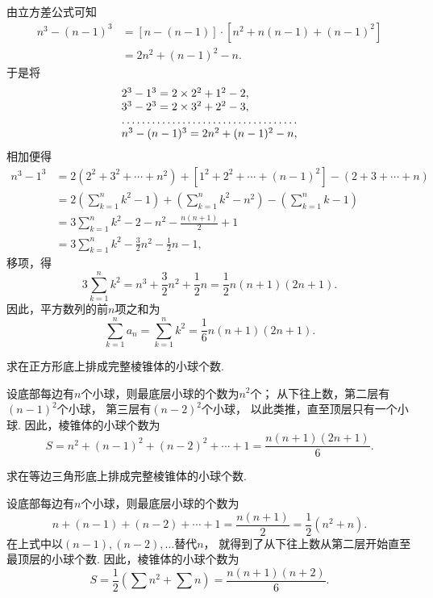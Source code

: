 由立方差公式可知
\[\begin{aligned}
n^3 - (n-1)^3
&= [n - (n-1)] \cdot [n^2 + n(n-1) + (n-1)^2] \\
&= 2n^2 + (n-1)^2 - n.
\end{aligned}\]于是将\[
\begin{array}{l}
2^3 - 1^3 = 2\times2^2+1^2-2, \\
3^3 - 2^3 = 2\times3^2+2^2-3, \\
\hdotsfor{1} \\
n^3 - (n-1)^3 = 2n^2 + (n-1)^2 - n,
\end{array}
\]相加便得\[\begin{aligned}
n^3 - 1^3
&= 2(2^2+3^2+\dotsb+n^2) + [1^2+2^2+\dotsb+(n-1)^2] - (2+3+\dotsb+n) \\
&= 2\left(\sum_{k=1}^n k^2 - 1\right)
    + \left(\sum_{k=1}^n k^2 - n^2\right)
    - \left(\sum_{k=1}^n k - 1\right) \\
&= 3\sum_{k=1}^n k^2 - 2 - n^2 - \frac{n(n+1)}{2} + 1 \\
&= 3\sum_{k=1}^n k^2 - \frac{3}{2} n^2 - \frac{1}{2} n - 1,
\end{aligned}\]
移项，得\[
3 \sum_{k=1}^n k^2
= n^3 + \frac{3}{2} n^2 + \frac{1}{2} n
= \frac{1}{2} n (n+1) (2n+1).
\]
因此，平方数列的前\(n\)项之和为
\begin{equation}
	\sum_{k=1}^n a_n
	= \sum_{k=1}^n k^2
	= \frac{1}{6} n(n+1)(2n+1).
\end{equation}

\begin{example}
求在正方形底上排成完整棱锥体的小球个数.
\begin{solution}
设底部每边有\(n\)个小球，则最底层小球的个数为\(n^2\)个；
从下往上数，第二层有\((n-1)^2\)个小球，
第三层有\((n-2)^2\)个小球，
以此类推，直至顶层只有一个小球.
因此，棱锥体的小球个数为\[
    S = n^2+(n-1)^2+(n-2)^2+\dotsb+1
    = \frac{n(n+1)(2n+1)}{6}.
\]
\end{solution}
\end{example}

\begin{example}
求在等边三角形底上排成完整棱锥体的小球个数.
\begin{solution}
设底部每边有\(n\)个小球，则最底层小球的个数为\[
    n+(n-1)+(n-2)+\dotsb+1
    = \frac{n(n+1)}{2}
    = \frac{1}{2}(n^2+n).
\]
在上式中以\((n-1),(n-2),\dotsc\)替代\(n\)，
就得到了从下往上数从第二层开始直至最顶层的小球个数.
因此，棱锥体的小球个数为\[
    S = \frac{1}{2} (\sum n^2 + \sum n)
    = \frac{n(n+1)(n+2)}{6}.
\]
\end{solution}
\end{example}

